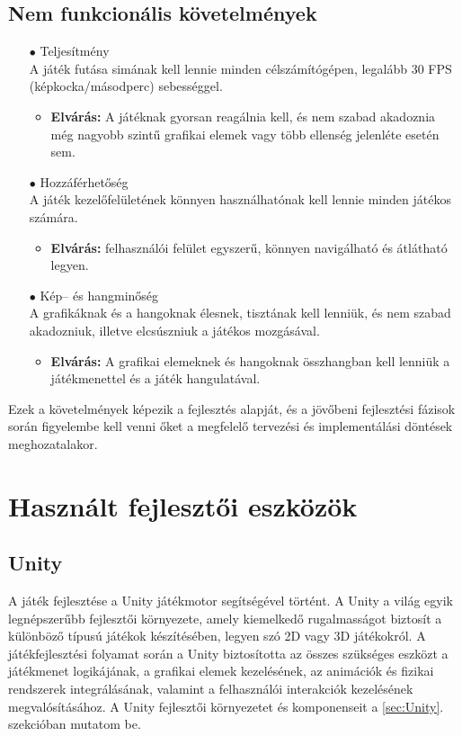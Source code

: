 \documentclass[
]{thesis-ekf}
\theoremstyle{definition}
\theoremstyle{remark}
\begin{document}
\subsection{Nem funkcionális követelmények}
\begin{itemize}
	\item[$\bullet$] Teljesítmény \\ A játék futása simának kell lennie minden célszámítógépen, legalább 30 FPS (képkocka/másodperc) sebességgel.
	\begin{itemize}
		\item \textbf{Elvárás:} A játéknak gyorsan reagálnia kell, és nem szabad akadoznia még nagyobb szintű grafikai elemek vagy több ellenség jelenléte esetén sem.
	\end{itemize}
	\item[$\bullet$] Hozzáférhetőség\\ A játék kezelőfelületének könnyen használhatónak kell lennie minden játékos számára.
	\begin{itemize}
		\item \textbf{Elvárás:} felhasználói felület egyszerű, könnyen navigálható és átlátható legyen.
	\end{itemize}
	\item[$\bullet$] Kép-- és hangminőség\\A grafikáknak és a hangoknak élesnek, tisztának kell lenniük, és nem szabad akadozniuk, illetve elcsúszniuk a játékos mozgásával.
	\begin{itemize}
		\item \textbf{Elvárás:} A grafikai elemeknek és hangoknak összhangban kell lenniük a játékmenettel és a játék hangulatával.
	\end{itemize}
\end{itemize}
Ezek a követelmények képezik a fejlesztés alapját, és a jövőbeni fejlesztési fázisok során figyelembe kell venni őket a megfelelő tervezési és implementálási döntések meghozatalakor.

\section{Használt fejlesztői eszközök}
\subsection{Unity}
A játék fejlesztése a Unity játékmotor segítségével történt. A Unity a világ egyik legnépszerűbb fejlesztői környezete, amely kiemelkedő rugalmasságot biztosít a különböző típusú játékok készítésében, legyen szó 2D vagy 3D játékokról. A játékfejlesztési folyamat során a Unity biztosította az összes szükséges eszközt a játékmenet logikájának, a grafikai elemek kezelésének, az animációk és fizikai rendszerek integrálásának, valamint a felhasználói interakciók kezelésének megvalósításához. A Unity fejlesztői környezetet és komponenseit a \ref{sec:Unity}. szekcióban mutatom be.
\end{document}
